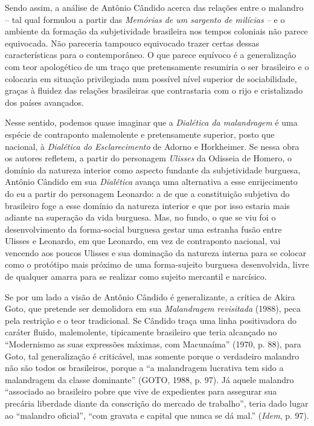 Sendo assim, a análise de Antônio Cândido acerca das relações entre o
malandro -- tal qual formulou a partir das \emph{Memórias de um sargento
de milícias --} e o ambiente da formação da subjetividade brasileira nos
tempos coloniais não parece equivocada. Não pareceria tampouco
equivocado trazer certas dessas características para o contemporâneo. O
que parece equívoco é a generalização com teor apologético de um traço
que pretensamente resumiria o ser brasileiro e o colocaria em situação
privilegiada num possível nível superior de sociabilidade, graças à
fluidez das relações brasileiras que contrastaria com o rijo e
cristalizado dos países avançados.

Nesse sentido, podemos quase imaginar que a \emph{Dialética da
malandragem} é uma espécie de contraponto malemolente e pretensamente
superior, posto que nacional, à \emph{Dialética do Esclarecimento} de
Adorno e Horkheimer. Se nessa obra os autores refletem, a partir do
personagem \emph{Ulisses} da Odisseia de Homero, o domínio da natureza
interior como aspecto fundante da subjetividade burguesa, Antônio
Cândido em sua \emph{Dialética} avança uma alternativa a esse
enrijecimento do eu a partir do personagem Leonardo: a de que a
constituição subjetiva do brasileiro foge a esse domínio da natureza
interior e que por isso estaria mais adiante na superação da vida
burguesa. Mas, no fundo, o que se viu foi o desenvolvimento da
forma-social burguesa gestar uma estranha fusão entre Ulisses e
Leonardo, em que Leonardo, em vez de contraponto nacional, vai vencendo
aos poucos Ulisses e sua dominação da natureza interna para se colocar
como o protótipo mais próximo de uma forma-sujeito burguesa
desenvolvida, livre de qualquer amarra para se realizar como sujeito
mercantil e narcísico.

Se por um lado a visão de Antônio Cândido é generalizante, a crítica de
Akira Goto, que pretende ser demolidora em sua \emph{Malandragem
revisitada} (1988), peca pela restrição e o teor tradicional. Se Cândido
traça uma linha positivadora do caráter fluido, malemolente, tipicamente
brasileiro que teria alcançado no ``Modernismo as suas expressões
máximas, com Macunaíma'' (1970, p. 88), para Goto, tal generalização é
criticável, mas somente porque o verdadeiro malandro não são todos os
brasileiros, porque a ``a malandragem lucrativa tem sido a malandragem
da classe dominante'' (GOTO, 1988, p. 97). Já aquele malandro
``associado ao brasileiro pobre que vive de expedientes para assegurar
sua precária liberdade diante da conscrição do mercado de trabalho'',
teria dado lugar ao ``malandro oficial'', ``com gravata e capital que
nunca se dá mal.'' (\emph{Idem}, p. 97).

